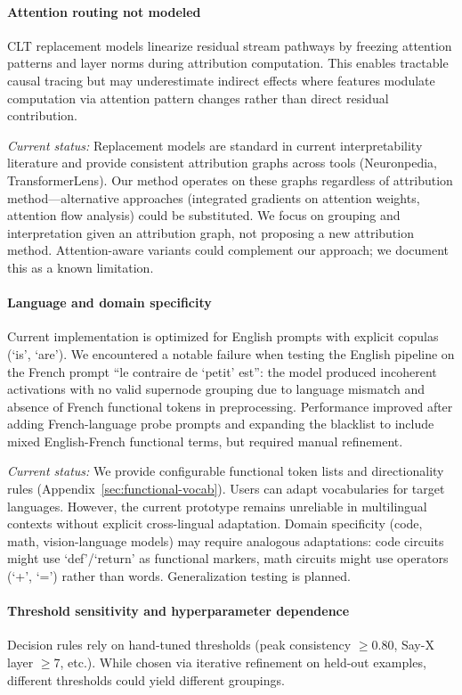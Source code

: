 \paragraph{Attention routing not modeled}
CLT replacement models linearize residual stream pathways by freezing attention patterns and layer norms during attribution computation. This enables tractable causal tracing but may underestimate indirect effects where features modulate computation via attention pattern changes rather than direct residual contribution.

\emph{Current status:} Replacement models are standard in current interpretability literature and provide consistent attribution graphs across tools (Neuronpedia, TransformerLens). Our method operates on these graphs regardless of attribution method---alternative approaches (integrated gradients on attention weights, attention flow analysis) could be substituted. We focus on grouping and interpretation given an attribution graph, not proposing a new attribution method. Attention-aware variants could complement our approach; we document this as a known limitation.

\paragraph{Language and domain specificity}
Current implementation is optimized for English prompts with explicit copulas (`is', `are'). We encountered a notable failure when testing the English pipeline on the French prompt ``le contraire de `petit' est'': the model produced incoherent activations with no valid supernode grouping due to language mismatch and absence of French functional tokens in preprocessing. Performance improved after adding French-language probe prompts and expanding the blacklist to include mixed English-French functional terms, but required manual refinement.

\emph{Current status:} We provide configurable functional token lists and directionality rules (Appendix~\ref{sec:functional-vocab}). Users can adapt vocabularies for target languages. However, the current prototype remains unreliable in multilingual contexts without explicit cross-lingual adaptation. Domain specificity (code, math, vision-language models) may require analogous adaptations: code circuits might use `def'/`return' as functional markers, math circuits might use operators (`+', `=') rather than words. Generalization testing is planned.

\paragraph{Threshold sensitivity and hyperparameter dependence}
Decision rules rely on hand-tuned thresholds (peak consistency $\ge$0.80, Say-X layer $\ge$7, etc.). While chosen via iterative refinement on held-out examples, different thresholds could yield different groupings.

